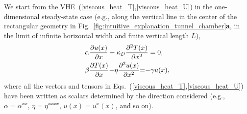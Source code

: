 \documentclass[
prb,
twocolumn,
superscriptaddress,
 amsmath,amssymb,
 aps,
longbibliography,
]{revtex4-2}
\begin{document}
We start from the VHE~(\ref{viscous_heat_T},\ref{viscous_heat_U}) in the one-dimensional steady-state case (e.g., along the vertical line in the center of the rectangular geometry in Fig.~\ref{fig:intuitive_explanation_tunnel_chamber}\textbf{a}, in the limit of infinite horizontal width and finite vertical length $L$),
\begin{align}
&\alpha\frac{\partial u(x)}{\partial x} - \kappa_D \frac{\partial^2 T (x)}{\partial x^2} = 0,
 \label{viscous_heat_T_1d}\\
&
\beta
\frac{\partial T(x)}{\partial x} {-} \eta \frac{\partial^2 u(x)}{\partial x^2} {=} {-} \gamma u(x),\label{viscous_heat_U_1D}
\raisetag{1mm}
\end{align}
where all the vectors and tensors in Eqs.~(\ref{viscous_heat_T},\ref{viscous_heat_U}) have been written as scalars determined by the direction considered (e.g., $\alpha=\alpha^{xx}$, $\eta=\eta^{xxxx}$, $u(x)=u^x(x)$, and so on).
\end{document}
